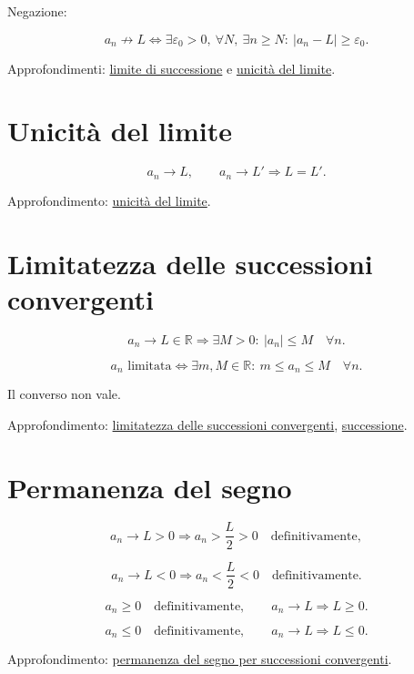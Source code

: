 Negazione:

\[
a_n\not\to L
\Longleftrightarrow
\exists\varepsilon_0>0,\ \forall N,\ \exists n\ge N:\
|a_n-L|\ge\varepsilon_0.
\]

Approfondimenti: \href{https://ingegnerismo.it/matematica/limite-di-successione/}{limite di successione} e \href{https://ingegnerismo.it/matematica/unicita-del-limite/}{unicità del limite}.

\section{Unicità del limite}\label{unicituxe0-del-limite}

\[
a_n\to L,
\qquad
a_n\to L'
\Longrightarrow
L=L'.
\]

Approfondimento: \href{https://ingegnerismo.it/matematica/unicita-del-limite/}{unicità del limite}.

\section{Limitatezza delle successioni convergenti}\label{limitatezza-delle-successioni-convergenti}

\[
a_n\to L\in\mathbb R
\Longrightarrow
\exists M>0:\ |a_n|\le M\quad\forall n.
\]

\[
a_n\text{ limitata}
\Longleftrightarrow
\exists m,M\in\mathbb R:\ m\le a_n\le M\quad\forall n.
\]

Il converso non vale.

Approfondimento: \href{https://ingegnerismo.it/matematica/limitatezza-delle-successioni-convergenti/}{limitatezza delle successioni convergenti}, \href{https://ingegnerismo.it/matematica/successione/}{successione}.

\section{Permanenza del segno}\label{permanenza-del-segno}

\[
a_n\to L>0
\Longrightarrow
a_n>\frac L2>0
\quad\text{definitivamente},
\]

\[
a_n\to L<0
\Longrightarrow
a_n<\frac L2<0
\quad\text{definitivamente}.
\]

\[
a_n\ge0\quad\text{definitivamente},
\qquad
a_n\to L
\Longrightarrow
L\ge0.
\]

\[
a_n\le0\quad\text{definitivamente},
\qquad
a_n\to L
\Longrightarrow
L\le0.
\]

Approfondimento: \href{https://ingegnerismo.it/matematica/permanenza-del-segno-per-successioni-convergenti/}{permanenza del segno per successioni convergenti}.

